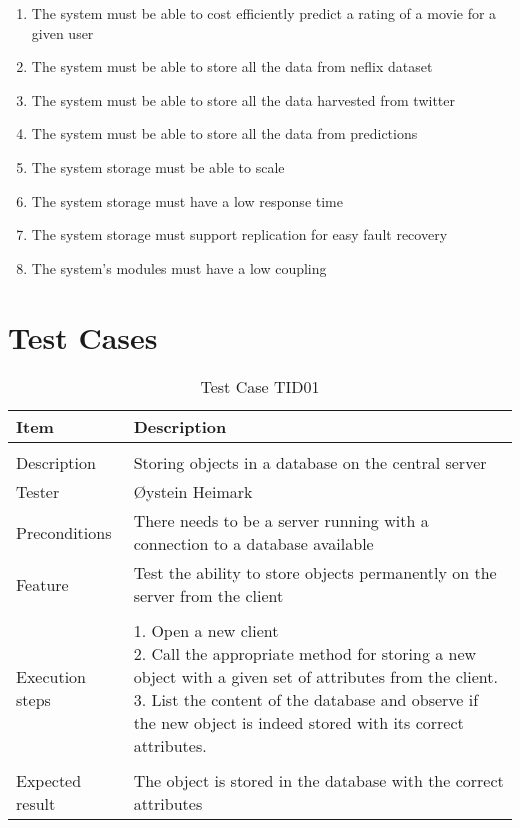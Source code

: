 \begin{enumerate}[label=\bfseries NFR \arabic*:]
  \item {\color{RedOrange}The system must be able to cost efficiently predict a rating of a movie for a given user}
  \item {\color{OliveGreen}The system must be able to store all the data from neflix dataset}
  \item {\color{OliveGreen}The system must be able to store all the data harvested from twitter}
  \item {\color{RedOrange}The system must be able to store all the data from predictions}
  \item {\color{OliveGreen}The system storage must be able to scale}
  \item {\color{OliveGreen}The system storage must have a low response time}
  \item {\color{OliveGreen}The system storage must support replication for easy fault recovery}
  \item {\color{OliveGreen}The system's modules must have a low coupling}
\end{enumerate}



\chapter{Test Cases}\label{app:test}
\begin{table}[H]
\caption{Test Case TID01}
\centering
\begin{tabular}{ l p{13cm} }
\hline
 Item            & Description                                                              \\
\hline \\ [-2.0ex]
 Description     & Storing objects in a database on the central server \\
 Tester          & Øystein Heimark                  \\
 Preconditions   & There needs to be a server running with a connection to a database available \\
 Feature         & Test the ability to store objects permanently on the server from the client  \vspace{3pt}   \\
\hline \\ [-1.5ex]
 Execution steps & \pbox{13cm}{1. Open a new client \\ 2. Call the appropriate method for storing a new object with a given set of attributes from the client. \\ 3. List the content of the database and observe if the new object is indeed stored with its correct attributes. } \vspace{3pt} \\
\hline \\ [-1.5ex]
 Expected result & The object is stored in the database with the correct attributes \\
\hline
\end{tabular}
\label{table:testcasetid01}
\end{table}
